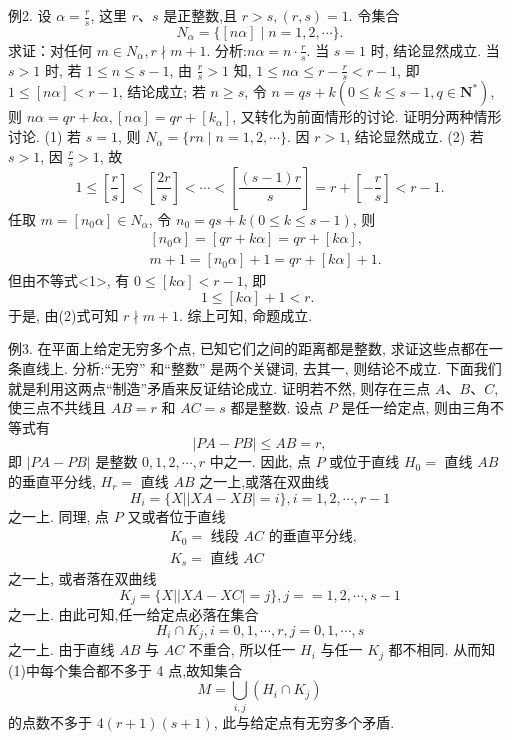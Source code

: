 例2. 设 $\alpha=\frac{r}{s}$, 这里 $r 、 s$ 是正整数,且 $r>s,(r, s)=1$. 令集合
$$
N_\alpha=\{[n \alpha] \mid n=1,2, \cdots\} .
$$
求证：对任何 $m \in N_\alpha, r \nmid m+1$.
分析:$n \alpha=n \cdot \frac{r}{s}$. 当 $s=1$ 时, 结论显然成立.
当 $s>1$ 时, 若 $1 \leqslant n \leqslant s-1$, 由 $\frac{r}{s}>1$ 知, $1 \leqslant n \alpha \leqslant r-\frac{r}{s}<r-1$, 即 $1 \leqslant[n \alpha]<r-1$, 结论成立; 若 $n \geqslant s$, 令 $n=q s+k\left(0 \leqslant k \leqslant s-1, q \in \mathbf{N}^*\right)$, 则 $n \alpha=q r+k \alpha,[n \alpha]= q r+\left[k_\alpha\right]$, 又转化为前面情形的讨论.
证明分两种情形讨论.
(1) 若 $s=1$, 则 $N_\alpha=\{r n \mid n=1,2, \cdots\}$. 因 $r>1$, 结论显然成立.
(2) 若 $s>1$, 因 $\frac{r}{s}>1$, 故
$$
1 \leqslant\left[\frac{r}{s}\right]<\left[\frac{2 r}{s}\right]<\cdots<\left[\frac{(s-1) r}{s}\right]=r+\left[-\frac{r}{s}\right]<r-1 .
$$
任取 $m=\left[n_0 \alpha\right] \in N_\alpha$, 令 $n_0=q s+k(0 \leqslant k \leqslant s-1)$, 则
$$
\begin{aligned}
& {\left[n_0 \alpha\right]=[q r+k \alpha]=q r+[k \alpha],} \\
& m+1=\left[n_0 \alpha\right]+1=q r+[k \alpha]+1 .
\end{aligned}
$$
但由不等式<1>, 有 $0 \leqslant[k \alpha]<r-1$, 即
$$
1 \leqslant[k \alpha]+1<r \text {. }
$$
于是, 由(2)式可知 $r \nmid m+1$.
综上可知, 命题成立.



例3. 在平面上给定无穷多个点, 已知它们之间的距离都是整数, 求证这些点都在一条直线上.
分析:“无穷” 和“整数” 是两个关键词, 去其一, 则结论不成立.
下面我们就是利用这两点“制造”矛盾来反证结论成立.
证明若不然, 则存在三点 $A 、 B 、 C$, 使三点不共线且 $A B=r$ 和 $A C=s$ 都是整数.
设点 $P$ 是任一给定点, 则由三角不等式有
$$
|P A-P B| \leqslant A B=r,
$$
即 $|P A-P B|$ 是整数 $0,1,2, \cdots, r$ 中之一.
因此, 点 $P$ 或位于直线
$H_0=$ 直线 $A B$ 的垂直平分线,
$H_r=$ 直线 $A B$
之一上,或落在双曲线
$$
H_i=\{X|| X A-X B \mid=i\}, i=1,2, \cdots, r-1
$$
之一上.
同理, 点 $P$ 又或者位于直线
$$
\begin{aligned}
& K_0=\text { 线段 } A C \text { 的垂直平分线, } \\
& K_s=\text { 直线 } A C
\end{aligned}
$$
之一上, 或者落在双曲线
$$
K_j=\{X|| X A-X C \mid=j\}, j==1,2, \cdots, s-1
$$
之一上.
由此可知,任一给定点必落在集合
$$
H_i \cap K_j, i=0,1, \cdots, r, j=0,1, \cdots, s
$$
之一上.
由于直线 $A B$ 与 $A C$ 不重合, 所以任一 $H_i$ 与任一 $K_j$ 都不相同.
从而知(1)中每个集合都不多于 4 点,故知集合
$$
M=\bigcup_{i, j}\left(H_i \cap K_j\right)
$$
的点数不多于 $4(r+1)(s+1)$, 此与给定点有无穷多个矛盾.




